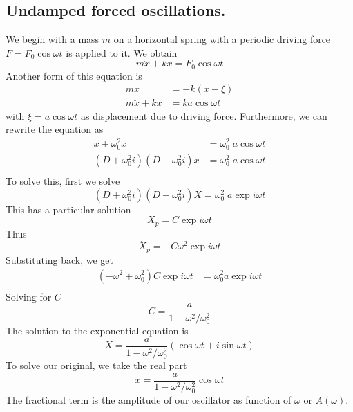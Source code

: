 \documentclass[../../../main.tex]{subfiles}
\begin{document}
\subsection{Undamped forced oscillations.} We begin with a mass $m$ on a horizontal spring with a periodic driving force $F = F_0 \cos \omega t$ is applied to it. We obtain
\begin{equation*}
    m\ddot{x}+kx=F_0 \cos \omega t
\end{equation*}
Another form of this equation is 
\begin{align*}
    m\ddot{x}&=-k(x-\xi)\\
    m\ddot{x}+kx&=ka \cos \omega t
\end{align*}
with $\xi=a \cos \omega t$ as displacement due to driving force. Furthermore, we can rewrite the equation as
\begin{align*}
    \ddot{x}+\omega_0^2x&=\omega_0^2\;a \cos \omega t\\
    (D+\omega_0^2i)(D-\omega_0^2i)x&=\omega_0^2\;a\cos \omega t\\
\end{align*}
To solve this, first we solve 
\begin{equation*}
    (D+\omega_0^2i)(D-\omega_0^2i)X=\omega_0^2\;a\exp i\omega t
\end{equation*}
This has a particular solution
\begin{equation*}
    X_p=C\exp{i\omega t}
\end{equation*}
Thus
\begin{equation*}
    \ddot{X}_p=-C\omega^2\exp{i\omega t}
\end{equation*}
Substituting back, we get
\begin{align*}
    (-\omega^2+\omega_0^2)C\exp{i\omega t}&=\omega_0^2a\exp{i\omega t}\\
\end{align*}
Solving for $C$
\begin{equation*}
    C=\frac{a}{1-\omega^2/\omega_0^2}
\end{equation*}
The solution to the exponential equation is 
\begin{equation*}
    X=\frac{a}{1-\omega^2/\omega_0^2}(\cos\omega t+i\sin \omega t)
\end{equation*}
To solve our original, we take the real part 
\begin{equation*}
    x=\frac{a}{1-\omega^2/\omega_0^2}\cos\omega t
\end{equation*}
The fractional term is the amplitude of our oscillator as function of $\omega$ or $A(\omega)$.
\end{document}
